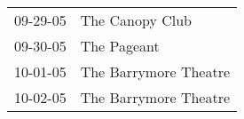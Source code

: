 \begin{supertabular}{p{0.25\columnwidth}p{0.75\columnwidth}}
 09-29-05 &        The Canopy Club \\
 09-30-05 &            The Pageant \\
 10-01-05 &  The Barrymore Theatre \\
 10-02-05 &  The Barrymore Theatre \\
\end{supertabular}
